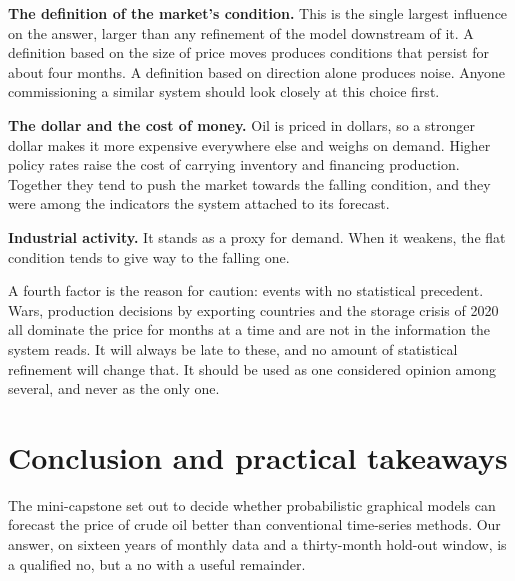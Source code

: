 \documentclass[11pt,a4paper]{article}
\begin{document}
\textbf{The definition of the market's condition.} This is the single largest influence on the
answer, larger than any refinement of the model downstream of it. A definition based on the size
of price moves produces conditions that persist for about four months. A definition based on
direction alone produces noise. Anyone commissioning a similar system should look closely at this
choice first.

\textbf{The dollar and the cost of money.} Oil is priced in dollars, so a stronger dollar makes it
more expensive everywhere else and weighs on demand. Higher policy rates raise the cost of carrying
inventory and financing production. Together they tend to push the market towards the falling condition,
and they were among the indicators the system attached to its forecast.

\textbf{Industrial activity.} It stands as a proxy for demand. When it weakens, the flat
condition tends to give way to the falling one.

A fourth factor is the reason for caution: events with no statistical precedent. Wars, production
decisions by exporting countries and the storage crisis of 2020 all dominate the price for
months at a time and are not in the information the system reads. It will always be late to
these, and no amount of statistical refinement will change that. It should be used as one
considered opinion among several, and never as the only one.

\section{Conclusion and practical takeaways}

The mini-capstone set out to decide whether probabilistic graphical models can forecast the
price of crude oil better than conventional time-series methods. Our answer, on sixteen years of
monthly data and a thirty-month hold-out window, is a qualified no, but a no with a useful
remainder.
\end{document}
